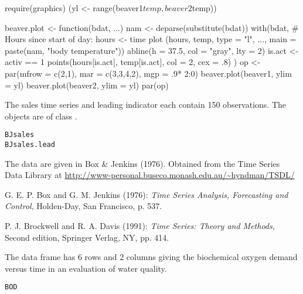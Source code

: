 \begin{Examples}
\begin{ExampleCode}
require(graphics)
(yl <- range(beaver1$temp, beaver2$temp))

beaver.plot <- function(bdat, ...) {
  nam <- deparse(substitute(bdat))
  with(bdat, {
    # Hours since start of day:
    hours <- time %
    plot (hours, temp, type = "l", ...,
          main = paste(nam, "body temperature"))
    abline(h = 37.5, col = "gray", lty = 2)
    is.act <- activ == 1
    points(hours[is.act], temp[is.act], col = 2, cex = .8)
  })
}
op <- par(mfrow = c(2,1), mar = c(3,3,4,2), mgp = .9* 2:0)
 beaver.plot(beaver1, ylim = yl)
 beaver.plot(beaver2, ylim = yl)
par(op)
\end{ExampleCode}
\end{Examples}
%
\begin{Description}\relax
The sales time series  and leading indicator
 each contain 150 observations.
The objects are of class .
\end{Description}
%
\begin{Usage}
\begin{verbatim}
BJsales
BJsales.lead
\end{verbatim}
\end{Usage}
%
\begin{Source}\relax
The data are given in Box \& Jenkins (1976).
Obtained from the Time Series Data Library at
\url{http://www-personal.buseco.monash.edu.au/~hyndman/TSDL/}
\end{Source}
%
\begin{References}\relax
G. E. P. Box and G. M. Jenkins (1976):
\emph{Time Series Analysis, Forecasting and Control},
Holden-Day, San Francisco, p. 537.

P. J. Brockwell and R. A. Davis (1991):
\emph{Time Series: Theory and Methods},
Second edition, Springer Verlag, NY, pp. 414.
\end{References}
%
\begin{Description}\relax
The  data frame has 6 rows and 2 columns giving the
biochemical oxygen demand versus time in an evaluation of water
quality.
\end{Description}
%
\begin{Usage}
\begin{verbatim}
BOD
\end{verbatim}
\end{Usage}
